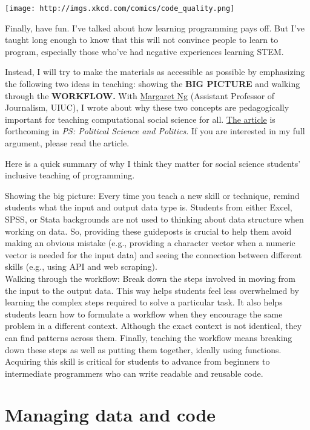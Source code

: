 \documentclass[
]{book}
\begin{document}
\texttt{[image: http://imgs.xkcd.com/comics/code\_quality.png]}

Finally, have fun. I've talked about how learning programming pays off. But I've taught long enough to know that this will not convince people to learn to program, especially those who've had negative experiences learning STEM.

Instead, I will try to make the materials as accessible as possible by emphasizing the following two ideas in teaching: showing the \textbf{BIG PICTURE} and walking through the \textbf{WORKFLOW.} With \href{https://media.illinois.edu/margaret-yee-man-ng}{Margaret Ng} (Assistant Professor of Journalism, UIUC), I wrote about why these two concepts are pedagogically important for teaching computational social science for all. \href{https://osf.io/preprints/socarxiv/pf7n6/?fbclid=IwAR2ZI0yw_pehS0mxAmeUBOGpzIhiO2LMUPGBzBLTLNo4C2HrJSoH9uZhgTY}{The article} is forthcoming in \emph{PS: Political Science and Politics.} If you are interested in my full argument, please read the article.

Here is a quick summary of why I think they matter for social science students' inclusive teaching of programming.

Showing the big picture: Every time you teach a new skill or technique, remind students what the input and output data type is. Students from either Excel, SPSS, or Stata backgrounds are not used to thinking about data structure when working on data. So, providing these guideposts is crucial to help them avoid making an obvious mistake (e.g., providing a character vector when a numeric vector is needed for the input data) and seeing the connection between different skills (e.g., using API and web scraping).\\
Walking through the workflow: Break down the steps involved in moving from the input to the output data. This way helps students feel less overwhelmed by learning the complex steps required to solve a particular task. It also helps students learn how to formulate a workflow when they encourage the same problem in a different context. Although the exact context is not identical, they can find patterns across them. Finally, teaching the workflow means breaking down these steps as well as putting them together, ideally using functions. Acquiring this skill is critical for students to advance from beginners to intermediate programmers who can write readable and reusable code.

\hypertarget{git_bash}{%
\chapter{Managing data and code}\label{git_bash}}
\end{document}
